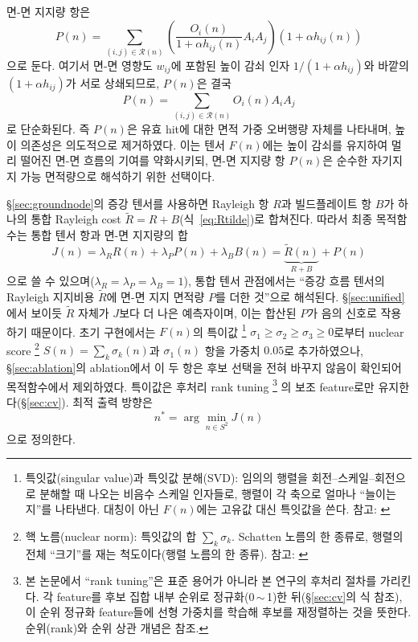 \documentclass[11pt,a4paper]{article}
\begin{document}
면-면 지지량 항은
\begin{equation}
P(n)
=
\sum_{(i,j)\in\mathcal{R}(n)}
\left(
\frac{O_i(n)}{1+\alpha h_{ij}(n)}A_iA_j
\right)
\left(1+\alpha h_{ij}(n)\right)
\end{equation}
으로 둔다.
여기서 면-면 영향도 $w_{ij}$에 포함된 높이 감쇠 인자 $1/(1+\alpha h_{ij})$와 바깥의 $(1+\alpha h_{ij})$가 서로 상쇄되므로,
$P(n)$은 결국
\begin{equation}
P(n)
=
\sum_{(i,j)\in\mathcal{R}(n)}
O_i(n)A_iA_j
\end{equation}
로 단순화된다.
즉 $P(n)$은 유효 hit에 대한 면적 가중 오버행량 자체를 나타내며,
높이 의존성은 의도적으로 제거하였다.
이는 텐서 $F(n)$에는 높이 감쇠를 유지하여 멀리 떨어진 면-면 흐름의 기여를 약화시키되,
면-면 지지량 항 $P(n)$은 순수한 자기지지 가능 면적량으로 해석하기 위한 선택이다.

\S\ref{sec:groundnode}의 증강 텐서를 사용하면 Rayleigh 항 $R$과 빌드플레이트 항 $B$가
하나의 통합 Rayleigh cost $\tilde R=R+B$(식~\eqref{eq:Rtilde})로 합쳐진다.
따라서 최종 목적함수는 통합 텐서 항과 면-면 지지량의 합
\begin{equation}
J(n)
=
\lambda_R R(n)
+
\lambda_P P(n)
+
\lambda_B B(n)
=
\underbrace{\tilde R(n)}_{R+B}
+
P(n)
\end{equation}
으로 쓸 수 있으며($\lambda_R=\lambda_P=\lambda_B=1$),
통합 텐서 관점에서는 ``증강 흐름 텐서의 Rayleigh 지지비용 $\tilde R$에
면-면 지지 면적량 $P$를 더한 것''으로 해석된다.
\S\ref{sec:unified}에서 보이듯 $\tilde R$ 자체가 $J$보다 더 나은 예측자이며,
이는 합산된 $P$가 음의 신호로 작용하기 때문이다.
초기 구현에서는 $F(n)$의 특이값%
\footnote{특잇값(singular value)과 특잇값 분해(SVD): 임의의 행렬을 회전--스케일--회전으로 분해할 때
나오는 비음수 스케일 인자들로, 행렬이 각 축으로 얼마나 ``늘이는지''를 나타낸다.
대칭이 아닌 $F(n)$에는 고유값 대신 특잇값을 쓴다. 참고: \cite{golubvanloan}}
$\sigma_1\ge\sigma_2\ge\sigma_3\ge0$로부터
nuclear score%
\footnote{핵 노름(nuclear norm): 특잇값의 합 $\sum_k\sigma_k$. Schatten 노름의 한 종류로,
행렬의 전체 ``크기''를 재는 척도이다(행렬 노름의 한 종류). 참고: \cite{hornjohnson}}
$S(n)=\sum_k\sigma_k(n)$과 $\sigma_1(n)$ 항을 가중치 $0.05$로 추가하였으나,
\S\ref{sec:ablation}의 ablation에서 이 두 항은 후보 선택을 전혀 바꾸지 않음이 확인되어 목적함수에서 제외하였다.
특이값은 후처리 rank tuning%
\footnote{본 논문에서 ``rank tuning''은 표준 용어가 아니라 본 연구의 후처리 절차를 가리킨다.
각 feature를 후보 집합 내부 순위로 정규화(0\,$\sim$\,1)한 뒤(\S\ref{sec:cv}의 식 참조),
이 순위 정규화 feature들에 선형 가중치를 학습해 후보를 재정렬하는 것을 뜻한다.
순위(rank)와 순위 상관 개념은 \cite{spearman1904} 참조.}
의 보조 feature로만 유지한다(\S\ref{sec:cv}).
최적 출력 방향은
\begin{equation}
n^* = \arg\min_{n\in S^2} J(n)
\end{equation}
으로 정의한다.
\end{document}
